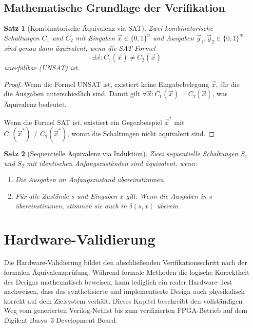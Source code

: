 ﻿\documentclass[12pt,a4paper]{report}
\newtheorem{theorem}{Satz}[section]
\begin{document}
\section{Mathematische Grundlage der Verifikation}

\begin{theorem}[Kombinatorische Äquivalenz via SAT]
Zwei kombinatorische Schaltungen $C_1$ und $C_2$ mit Eingaben $\vec{x} \in \{0,1\}^n$ und Ausgaben $\vec{y}_1, \vec{y}_2 \in \{0,1\}^m$ sind genau dann äquivalent, wenn die SAT-Formel
\[
\exists \vec{x} : C_1(\vec{x}) \neq C_2(\vec{x})
\]
unerfüllbar (UNSAT) ist.
\end{theorem}

\begin{proof}
Wenn die Formel UNSAT ist, existiert keine Eingabebelegung $\vec{x}$, für die die Ausgaben unterschiedlich sind. Damit gilt $\forall \vec{x} : C_1(\vec{x}) = C_2(\vec{x})$, was Äquivalenz bedeutet.

Wenn die Formel SAT ist, existiert ein Gegenbeispiel $\vec{x}^*$ mit $C_1(\vec{x}^*) \neq C_2(\vec{x}^*)$, womit die Schaltungen nicht äquivalent sind.
\end{proof}

\begin{theorem}[Sequentielle Äquivalenz via Induktion]
Zwei sequentielle Schaltungen $S_1$ und $S_2$ mit identischen Anfangszuständen sind äquivalent, wenn:
\begin{enumerate}
    \item Die Ausgaben im Anfangszustand übereinstimmen
    \item Für alle Zustände $s$ und Eingaben $x$ gilt: Wenn die Ausgaben in $s$ übereinstimmen, stimmen sie auch in $\delta(s, x)$ überein
\end{enumerate}
\end{theorem}

\chapter{Hardware-Validierung}
\label{chap:hardware_validierung}

Die Hardware-Validierung bildet den abschließenden Verifikationsschritt nach der formalen Äquivalenzprüfung. Während formale Methoden die logische Korrektheit des Designs mathematisch beweisen, kann lediglich ein realer Hardware-Test nachweisen, dass das synthetisierte und implementierte Design auch physikalisch korrekt auf dem Zielsystem verhält. Dieses Kapitel beschreibt den vollständigen Weg vom generierten Verilog-Netlist bis zum verifizierten FPGA-Betrieb auf dem Digilent Basys~3 Development Board.
\end{document}
